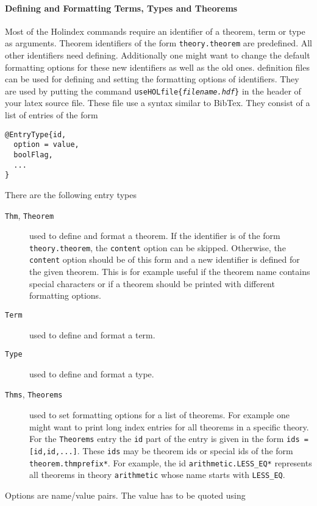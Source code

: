 

\paragraph{Defining and Formatting Terms, Types and Theorems}

  Most of the Holindex commands require an identifier of a theorem,
  term or type as arguments. Theorem identifiers of the form
  \texttt{theory.theorem} are predefined. All other identifiers need
  defining. Additionally one might want to change the default
  formatting options for these new identifiers as well as the old ones.
  \HOL{} definition files can be used for defining and
  setting the formatting options of identifiers. They are used by
  putting the command \texttt{\bs{}useHOLfile\{\textit{filename.hdf}\}} in
  the header of your latex source file. These file use a syntax similar to
  BibTex. They consist of a list of entries of the form
  \begin{verbatim}
@EntryType{id,
  option = value,
  boolFlag,
  ...
}
\end{verbatim}
\noindent
There are the following entry types
\begin{description}
\item[\texttt{Thm}, \texttt{Theorem}] used to define and format a
  theorem. If the identifier is of the form \texttt{theory.theorem},
  the \texttt{content} option can be skipped. Otherwise, the
  \texttt{content} option should be of this form and a new identifier
  is defined for the given theorem. This is for example useful if the
  theorem name contains special characters or if a theorem should
  be printed with different formatting options.
  \item[\texttt{Term}]
    used to define and format a term.
  \item[\texttt{Type}]
    used to define and format a type.
  \item[\texttt{Thms}, \texttt{Theorems}] used to set formatting options for
    a list of theorems. For example one might want to print long index entries
    for all theorems in a specific theory. For the \texttt{Theorems} entry
    the \texttt{id} part of the entry is given in the form
    \texttt{ids = [id,id,...]}. These \texttt{ids} may be theorem ids or special
    ids of the form \texttt{theorem.thmprefix*}.
    For example, the id
    \texttt{arithmetic.LESS\_EQ*} represents all theorems in
    theory \texttt{arithmetic} whose name starts with \texttt{LESS\_EQ}.
\end{description}
Options are name/value pairs. The value has to be quoted using
